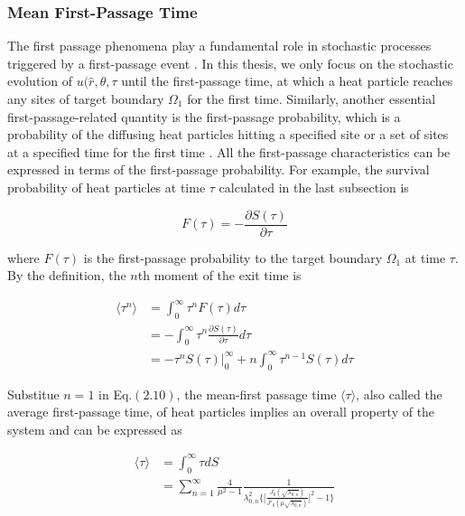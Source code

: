 \subsubsection{Mean First-Passage Time}

The first passage phenomena play a fundamental role in stochastic
processes triggered by a first-passage event
\cite{van1992stochastic}. In this thesis, we only focus on the
stochastic evolution of $u(\hat r, \theta, \tau$ until the
first-passage time, at which a heat particle reaches any sites of
target boundary $\Omega_1$ for the first time. Similarly, another
essential first-passage-related quantity is the first-passage
probability, which is a probability of the diffusing heat particles
hitting a specified site or a set of sites at a specified time for the
first time \cite{redner2001guide}. All the first-passage
characteristics can be expressed in terms of the first-passage
probability. For example, the survival probability of heat particles
at time $\tau$ calculated in the last subsection is

\begin{equation}
  F(\tau) = - \frac{\partial S(\tau)}{\partial \tau}
\end{equation}

where $F(\tau)$ is the first-passage probability to the target
boundary $\Omega_1$ at time $\tau$. By the definition, the $n$th
moment of the exit time \cite{redner2001guide} is

\begin{equation}
  \begin{split}
    \langle \tau^n \rangle &= \int_{0}^{\infty} \tau^n F(\tau) d\tau \\
    &= - \int_{0}^{\infty} \tau^n  \frac{\partial S(\tau)}{\partial \tau} d\tau \\
    &= -\tau^n S(\tau) |_{0}^{\infty} + n\int_{0}^{\infty} \tau^{n-1}S(\tau) d\tau
\end{split}
\end{equation}


Substitue $n=1$ in Eq.$(2.10)$, the mean-first passage time $\langle
\tau \rangle$, also called the average first-passage time, of heat
particles implies an overall property of the system and can be
expressed as

\begin{equation}
  \begin{split}
    \langle \tau \rangle &= \int_{0}^{\infty} \tau dS\\
    &=\sum_{n=1}^{\infty} \frac{4}{\mu^2 - 1}
    \frac{1}{\lambda^2_{0,n}\bigg\{\bigg[\frac{J_0(\sqrt{\lambda_{0,n}})}{J'_0(\mu\sqrt{\lambda_{0,n}})}\bigg]^2
      -1\bigg\}}
  \end{split}
\end{equation}

